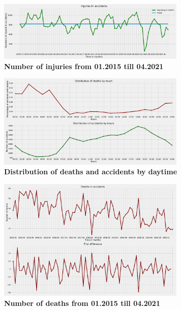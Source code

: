 \begin{figure}[htpb]
	\centering
	\includegraphics[width=0.8\textwidth]{../imgs/pdf_files/ts_injuries.pdf}
	\caption{\textbf{Number of injuries from 01.2015 till 04.2021}}
	\label{fig:ts_inj}
\end{figure}

\begin{figure}[htpb]
	\centering
	\includegraphics[width=0.8\textwidth]{../imgs/pdf_files/ts_distributions.pdf}
	\caption{\textbf{Distribution of deaths and accidents by daytime}}
	\label{fig:ts_dist}
\end{figure}
\begin{figure}[htpb]
	\centering
	\includegraphics[width=0.8\textwidth]{../imgs/pdf_files/ts_death_first_diff.pdf}
	\caption{\textbf{Number of deaths from 01.2015 till 04.2021}}
	\label{fig:ts_death}
\end{figure}
